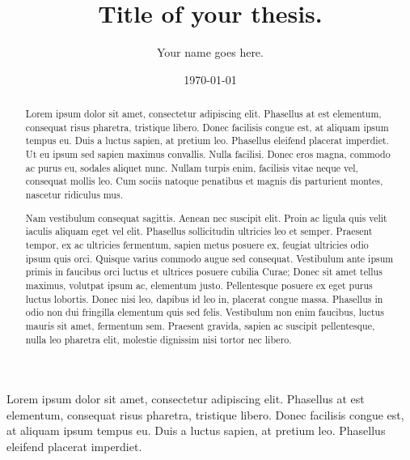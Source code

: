 \documentclass[12pt,oneside]{report}
\author{Your name goes here.}
\title{Title of your thesis.}
\date{\today}
\begin{document}

\cartitle


\begin{abstract}
	Lorem\cite{website:repository} ipsum dolor sit amet, consectetur
	adipiscing elit. Phasellus at est elementum, consequat risus pharetra,
	tristique libero. Donec facilisis congue est, at aliquam ipsum tempus
	eu. Duis a luctus sapien, at pretium leo. Phasellus eleifend placerat
	imperdiet. Ut eu ipsum sed sapien maximus convallis. Nulla facilisi.
	Donec eros magna, commodo ac purus eu, sodales aliquet nunc. Nullam
	turpis enim, facilisis vitae neque vel, consequat mollis leo. Cum sociis
	natoque penatibus et magnis dis parturient montes, nascetur ridiculus
	mus.

	Nam vestibulum consequat sagittis. Aenean nec suscipit elit. Proin ac
	ligula quis velit iaculis aliquam eget vel elit. Phasellus sollicitudin
	ultricies leo et semper. Praesent tempor, ex ac ultricies fermentum,
	sapien metus posuere ex, feugiat ultricies odio ipsum quis orci. Quisque
	varius commodo augue sed consequat. Vestibulum ante ipsum primis in
	faucibus orci luctus et ultrices posuere cubilia Curae; Donec sit amet
	tellus maximus, volutpat ipsum ac, elementum justo. Pellentesque posuere
	ex eget purus luctus lobortis. Donec nisi leo, dapibus id leo in,
	placerat congue massa. Phasellus in odio non dui fringilla elementum
	quis sed felis. Vestibulum non enim faucibus, luctus mauris sit amet,
	fermentum sem. Praesent gravida, sapien ac suscipit pellentesque, nulla
	leo pharetra elit, molestie dignissim nisi tortor nec libero.
\end{abstract}


\begin{caracks}
	Lorem ipsum dolor sit amet, consectetur adipiscing elit. Phasellus at
	est elementum, consequat risus pharetra, tristique libero. Donec
	facilisis congue est, at aliquam ipsum tempus eu. Duis a luctus sapien,
	at pretium leo. Phasellus eleifend placerat imperdiet.
\end{caracks}
\end{document}

